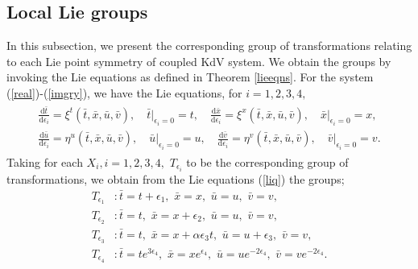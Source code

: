 \subsection{Local Lie groups}
In this subsection, we present the corresponding group of transformations relating to each Lie point symmetry of coupled KdV system. We obtain the groups by invoking the Lie equations as defined in Theorem \ref{lieeqns}. For the system (\ref{real})-(\ref{imgry}), we have the Lie equations, for $i=1,2,3,4,$
\begin{align} \begin{aligned}
 \frac{ \mathrm{d} \bar{t}}{ \mathrm{d} \epsilon_i} = \xi^t( \bar{t},\bar{x},\bar{u},\bar{v}),\quad \bar{t}\Big |_{ \epsilon_i =0} =t, \quad
\frac{ \mathrm{d} \bar{x}}{  \mathrm{d} \epsilon_i} = \xi^x( \bar{t},\bar{x},\bar{u},\bar{v}),\quad \bar{x}\Big |_{ \epsilon_i =0} =x, \\
\frac{ \mathrm{d} \bar{u}}{  \mathrm{d} \epsilon_i} = \eta^u( \bar{t},\bar{x},\bar{u},\bar{v}),\quad \bar{u}\Big |_{ \epsilon_i =0} =u, \quad \frac{ \mathrm{d} \bar{v}}{  \mathrm{d} \epsilon_i} =\eta^v( \bar{t},\bar{x},\bar{u},\bar{v}),\quad \bar{v}\Big |_{ \epsilon_i =0} =v. \label{liq} \end{aligned}
\end{align}
 Taking for each $X_i, i =1,2,3,4, \,\,  T_{\epsilon_i}$ to be the corresponding group of transformations, we obtain from the Lie equations (\ref{liq}) the groups;
 \begin{align}
  T_{\epsilon_1}& :  \bar{t}=t+\epsilon_1, \,\, \bar{x}=x,\,\,  \bar{u}=u,\,\, \bar{v}=v,\\
  T_{\epsilon_2}& :  \bar{t}=t, \,\,  \bar{x}=x +\epsilon_2 ,\,\, \bar{u}=u, \,\, \bar{v}=v,\\ 
 T_{\epsilon_3}& :  \bar{t}=t, \,\, \bar{x}=x + \alpha\epsilon_3t,\,\, \bar{u}=u+\epsilon_3,\,\, \bar{v}=v,\\
  T_{\epsilon_4} &:  \bar{t}=t e^{3 \epsilon_4}, \,\, \bar{x}= xe^{\epsilon_4},\,\, \bar{u} = ue^{-2\epsilon_4},\,\, \bar{v}=ve^{-2\epsilon_4}. \label{lclg4}
 \end{align}
